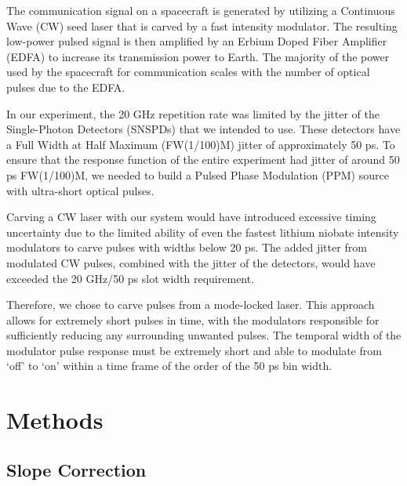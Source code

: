 \documentclass[11pt]{caltech_thesis} %
\begin{document}
The communication signal on a spacecraft is generated by utilizing a
Continuous Wave (CW) seed laser that is carved by a fast intensity
modulator. The resulting low-power pulsed signal is then amplified by an
Erbium Doped Fiber Amplifier (EDFA) to increase its transmission power
to Earth. The majority of the power used by the spacecraft for
communication scales with the number of optical pulses due to the EDFA.

In our experiment, the 20 GHz repetition rate was limited by the jitter
of the Single-Photon Detectors (SNSPDs) that we intended to use. These
detectors have a Full Width at Half Maximum (FW(1/100)M) jitter of
approximately 50 ps. To ensure that the response function of the entire
experiment had jitter of around 50 ps FW(1/100)M, we needed to build a
Pulsed Phase Modulation (PPM) source with ultra-short optical pulses.

Carving a CW laser with our system would have introduced excessive
timing uncertainty due to the limited ability of even the fastest
lithium niobate intensity modulators to carve pulses with widths below
20 ps. The added jitter from modulated CW pulses, combined with the
jitter of the detectors, would have exceeded the 20 GHz/50 ps slot width
requirement.

Therefore, we chose to carve pulses from a mode-locked laser. This
approach allows for extremely short pulses in time, with the modulators
responsible for sufficiently reducing any surrounding unwanted pulses.
The temporal width of the modulator pulse response must be extremely
short and able to modulate from `off' to `on' within a time frame of the
order of the 50 ps bin width.

\hypertarget{methods-1}{%
\section{Methods}\label{methods-1}}

\hypertarget{slope-correction}{%
\subsection{Slope Correction}\label{slope-correction}}
\end{document}
